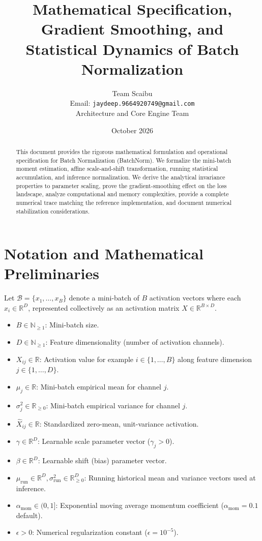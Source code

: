 \documentclass[11pt,a4paper]{article}
\title{\textbf{Mathematical Specification, Gradient Smoothing, and Statistical Dynamics of Batch Normalization}}
\author{Team Scaibu \\ \small Email: \texttt{jaydeep.9664920749@gmail.com} \\ \small Architecture and Core Engine Team}
\date{October 2026}
\theoremstyle{definition}
\begin{document}
\maketitle

\begin{abstract}
This document provides the rigorous mathematical formulation and operational specification for Batch Normalization (BatchNorm). We formalize the mini-batch moment estimation, affine scale-and-shift transformation, running statistical accumulation, and inference normalization. We derive the analytical invariance properties to parameter scaling, prove the gradient-smoothing effect on the loss landscape, analyze computational and memory complexities, provide a complete numerical trace matching the reference implementation, and document numerical stabilization considerations.
\end{abstract}

\section{Notation and Mathematical Preliminaries}

Let $\mathcal{B} = \{x_1, \dots, x_B\}$ denote a mini-batch of $B$ activation vectors where each $x_i \in \mathbb{R}^D$, represented collectively as an activation matrix $X \in \mathbb{R}^{B \times D}$.

\begin{itemize}
    \item $B \in \mathbb{N}_{\ge 1}$: Mini-batch size.
    \item $D \in \mathbb{N}_{\ge 1}$: Feature dimensionality (number of activation channels).
    \item $X_{ij} \in \mathbb{R}$: Activation value for example $i \in \{1, \dots, B\}$ along feature dimension $j \in \{1, \dots, D\}$.
    \item $\mu_j \in \mathbb{R}$: Mini-batch empirical mean for channel $j$.
    \item $\sigma_j^2 \in \mathbb{R}_{\ge 0}$: Mini-batch empirical variance for channel $j$.
    \item $\hat{X}_{ij} \in \mathbb{R}$: Standardized zero-mean, unit-variance activation.
    \item $\gamma \in \mathbb{R}^D$: Learnable scale parameter vector ($\gamma_j > 0$).
    \item $\beta \in \mathbb{R}^D$: Learnable shift (bias) parameter vector.
    \item $\mu_{\text{run}} \in \mathbb{R}^D, \sigma_{\text{run}}^2 \in \mathbb{R}^D_{\ge 0}$: Running historical mean and variance vectors used at inference.
    \item $\alpha_{\text{mom}} \in (0, 1]$: Exponential moving average momentum coefficient ($\alpha_{\text{mom}} = 0.1$ default).
    \item $\epsilon > 0$: Numerical regularization constant ($\epsilon = 10^{-5}$).
\end{itemize}
\end{document}
